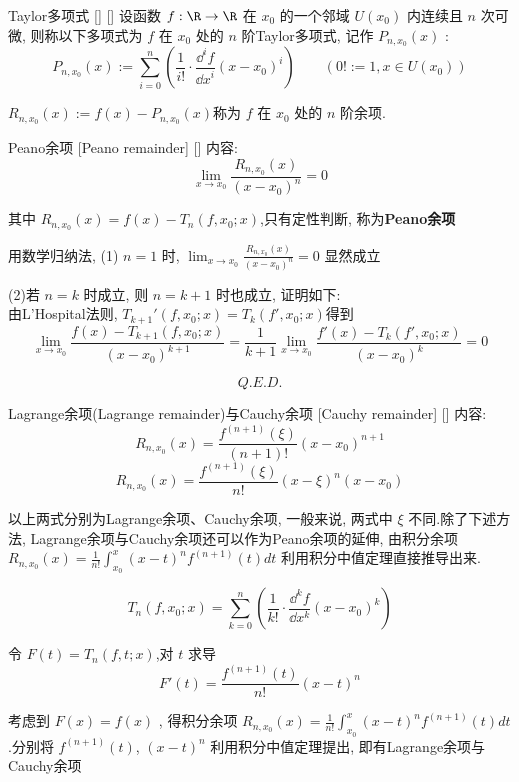 \documentclass[UTF8]{ctexart}
\begin{document}
			\begin{dfn}
			    []
			    {Taylor多项式}
			    []
			    []
				设函数 \(f:\R\to\R\) 在 \(x_0\) 的一个邻域 \(U(x_0)\) 内连续且 \(n\) 次可微, 则称以下多项式为 \(f\) 在 \(x_0\) 处的 \(n\) 阶Taylor多项式, 记作 \(P_{n,x_0}(x)\) : 
				\[P_{n,x_0}(x):=\sum_{i=0}^n\left(\frac{1}{i!}\cdot\frac{\dd^i f}{{\dd x}^i}(x-x_0)^i\right)\qquad(0!:=1, x\in U(x_0))\]

				\(R_{n,x_0}(x):=f(x)-P_{n,x_0}(x)\)称为 \(f\) 在 \(x_0\) 处的 \(n\) 阶余项. 
			\end{dfn}
			
			\begin{thm}
			    []
			    {Peano余项}
			    [Peano remainder]
			    []
				内容: 
				\[\lim_{x\to x_0}\frac{R_{n,x_0}(x)}{(x-x_0)^n}=0\]

				其中 \(R_{n,x_0}(x)=f(x)-T_n(f,x_0;x)\),只有定性判断, 称为\textbf{Peano余项}
			\end{thm}
				
			\begin{prf}
				
				用数学归纳法,  (1) \(n=1\) 时, \(\lim_{x\to x_0}\frac{R_{n,x_0}(x)}{(x-x_0)^n}=0\) 显然成立

				(2)若 \(n=k\) 时成立, 则 \(n=k+1\) 时也成立, 证明如下: \\
				由L'Hospital法则, \(T_{k+1}'(f,x_0;x)=T_k(f',x_0;x)\)得到
				\[\lim_{x\to x_0}\frac{f(x)-T_{k+1}(f,x_0;x)}{(x-x_0)^{k+1}}=\frac{1}{k+1}\lim_{x\to x_0}\frac{f'(x)-T_k(f',x_0;x)}{(x-x_0)^k}=0\]

				\[Q.E.D.\]

			\end{prf}

			\begin{thm}
			    []
			    {Lagrange余项(Lagrange remainder)与Cauchy余项}
			    [Cauchy remainder]
			    []
				内容: 
				\[R_{n,x_0}(x)=\frac{f^{(n+1)}(\xi)}{(n+1)!}(x-x_0)^{n+1}\]
				\[R_{n,x_0}(x)=\frac{f^{(n+1)}(\xi)}{n!}(x-\xi)^n(x-x_0)\]

				以上两式分别为Lagrange余项、Cauchy余项, 一般来说, 两式中 \(\xi\) 不同.除了下述方法, Lagrange余项与Cauchy余项还可以作为Peano余项的延伸, 由积分余项 \(R_{n,x_0}(x)=\frac{1}{n!}\int_{x_0}^{x}(x-t)^nf^{(n+1)}(t)dt\) 利用积分中值定理直接推导出来.
			\end{thm}

			\begin{prf}

				\[T_n(f,x_0;x)=\sum_{k=0}^n\left(\frac{1}{k!}\cdot\frac{\dd^k f}{\dd x^k}(x-x_0)^k\right)\]

				令 \(F(t)=T_n(f,t;x)\),对 \(t\) 求导
				\[F'(t)=\frac{f^{(n+1)}(t)}{n!}(x-t)^n\]

				考虑到 \(F(x)=f(x)\) , 得积分余项 \(R_{n,x_0}(x)=\frac{1}{n!}\int_{x_0}^{x}(x-t)^nf^{(n+1)}(t)dt\).分别将 \(f^{(n+1)}(t)\), \((x-t)^n\) 利用积分中值定理提出, 即有Lagrange余项与Cauchy余项

			\end{prf}
\end{document}
